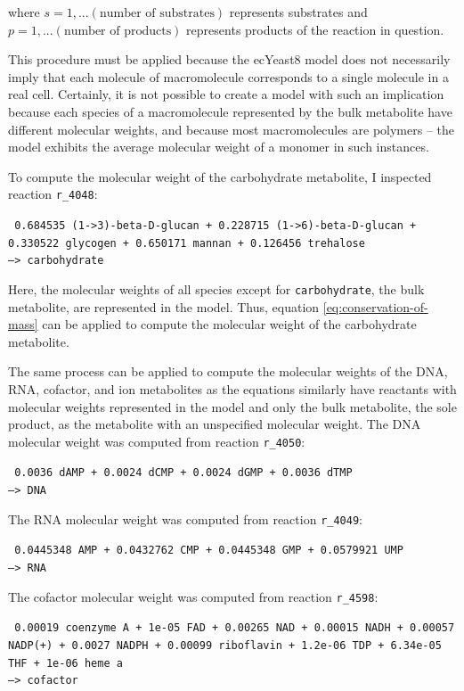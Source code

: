 where $s = 1, ... (\text{number of substrates})$ represents substrates and $p = 1, ... (\text{number of products})$ represents products of the reaction in question.

This procedure must be applied because the ecYeast8 model does not necessarily imply that each molecule of macromolecule corresponds to a single molecule in a real cell.
Certainly, it is not possible to create a model with such an implication because each species of a macromolecule represented by the bulk metabolite have different molecular weights, and because most macromolecules are polymers -- the model exhibits the average molecular weight of a monomer in such instances.

To compute the molecular weight of the carbohydrate metabolite, I inspected reaction \texttt{r\_4048}:

\texttt{
  0.684535 (1->3)-beta-D-glucan + 0.228715 (1->6)-beta-D-glucan + 0.330522 glycogen + 0.650171 mannan + 0.126456 trehalose \\
  --> carbohydrate
}

Here, the molecular weights of all species except for \texttt{carbohydrate}, the bulk metabolite, are represented in the model.
Thus, equation \ref{eq:conservation-of-mass} can be applied to compute the molecular weight of the carbohydrate metabolite.

The same process can be applied to compute the molecular weights of the DNA, RNA, cofactor, and ion metabolites as the equations similarly have reactants with molecular weights represented in the model and only the bulk metabolite, the sole product, as the metabolite with an unspecified molecular weight.
The DNA molecular weight was computed from reaction \texttt{r\_4050}:

\texttt{
  0.0036 dAMP + 0.0024 dCMP + 0.0024 dGMP + 0.0036 dTMP
  \\ --> DNA
}

The RNA molecular weight was computed from reaction \texttt{r\_4049}:

\texttt{
  0.0445348 AMP + 0.0432762 CMP + 0.0445348 GMP + 0.0579921 UMP
  \\ --> RNA
}

The cofactor molecular weight was computed from reaction \texttt{r\_4598}:

\texttt{
  0.00019 coenzyme A + 1e-05 FAD + 0.00265 NAD + 0.00015 NADH + 0.00057 NADP(+) + 0.0027 NADPH + 0.00099 riboflavin + 1.2e-06 TDP + 6.34e-05 THF + 1e-06 heme a
  \\ --> cofactor
}

